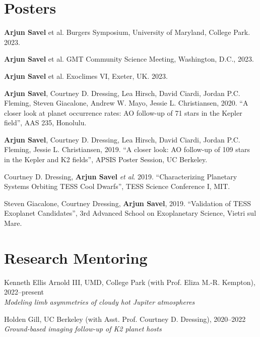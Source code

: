 \documentclass[letterpaper,10.5pt]{article}
\newcommand{\resumeSubHeadingListStart}{\begin{itemize}[leftmargin=*]}
\newcommand{\shorterSection}[1]{\vspace{-10pt}\section{#1}}
\begin{document}
\shorterSection{Posters}
\small
  \begin{list}{}{\cvlist}
  \item[{\color{numcolor}\scriptsize7}]\textbf{Arjun Savel} et al. Burgers Symposium, University of Maryland, College Park. 2023.
  
  \item[{\color{numcolor}\scriptsize6}]\textbf{Arjun Savel} et al. GMT Community Science Meeting, Washington, D.C., 2023.
  
  \item[{\color{numcolor}\scriptsize5}]\textbf{Arjun Savel} et al. Exoclimes VI, Exeter, UK. 2023.
  
  \item[{\color{numcolor}\scriptsize4}]\textbf{Arjun Savel}, Courtney D. Dressing, Lea Hirsch, David Ciardi, Jordan P.C. Fleming, Steven Giacalone, Andrew W. Mayo, Jessie L. Christiansen, 2020. “A closer look at planet occurrence rates: AO follow-up of 71 stars in the Kepler field”, AAS 235, Honolulu.

  \item[{\color{numcolor}\scriptsize3}] \textbf{Arjun Savel}, Courtney D. Dressing, Lea Hirsch, David Ciardi, Jordan P.C. Fleming, Jessie L. Christiansen, 2019. “A closer look: AO follow-up of 109 stars in the Kepler and K2 fields”, APSIS Poster Session, UC Berkeley.

\item[{\color{numcolor}\scriptsize2}] Courtney D. Dressing, \textbf{Arjun Savel} \textit{et al}. 2019. “Characterizing Planetary Systems Orbiting TESS Cool Dwarfs”, TESS Science Conference I, MIT.

\item[{\color{numcolor}\scriptsize1}] Steven Giacalone, Courtney Dressing, \textbf{Arjun Savel}, 2019. “Validation of TESS Exoplanet Candidates”, 3rd Advanced School on Exoplanetary Science, Vietri sul Mare.

  \end{list}

\shorterSection{Research Mentoring}
\small
  \begin{list}{}{\cvlist}  
  \item[{\color{numcolor}}]Kenneth Ellis Arnold III, UMD, College Park (with Prof. Eliza M.-R. Kempton), 2022--present \\
  \textit{Modeling limb asymmetries of cloudy hot Jupiter atmospheres}
  \item[{\color{numcolor}}]Holden Gill, UC Berkeley (with Asst. Prof. Courtney D. Dressing), 2020--2022 \\
    \textit{Ground-based imaging follow-up of K2 planet hosts}


  \end{list}
\end{document}
